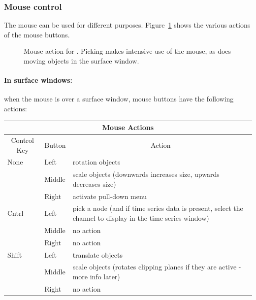 \subsubsection{Mouse control}
\label{sec:control-mouse} 

The mouse can be used for different purposes. Figure~\ref{fig:mouse} 
shows the various actions of the mouse
buttons. 

\begin{figure}[htb]
  \begin{makeimage}
  \end{makeimage}
  \mouseaction
  \caption{\label{fig:mouse} Mouse action for \map{}. Picking
  makes intensive use of the mouse, as does moving objects in the surface
  window.}
\end{figure}

\paragraph{In surface windows: } when the mouse is over a surface window,
mouse buttons have the following actions:
\begin{center}
  \begin{tabular}{|l|l|p{3in}|} \hline
    \multicolumn{3}{|c|}{Mouse Actions}\\ \hline
    \multicolumn{1}{|c|}{Control Key} & 
    \multicolumn{1}{|c|}{Button} & 
    \multicolumn{1}{|c|}{Action}\\ \hline
    None & Left & rotation objects \\
    & Middle & scale objects (downwards increases size, upwards decreases
    size) \\ 
    & Right & activate pull-down menu \\ \hline
    Cntrl & Left & pick a node (and if time series data is present, select the
    channel to display in the time series window) \\
    & Middle &  no action \\
    & Right &  no action \\ \hline
    Shift & Left & translate objects \\
    & Middle & scale objects (rotates clipping planes if they are active
    - more info later) \\ 
    & Right & no action \\ \hline
\end{tabular}
\end{center}

